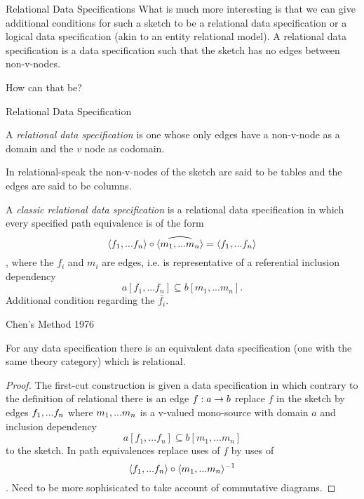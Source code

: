 \begin{frame}{Relational Data Specifications}
What is much more interesting is that we can give additional conditions for such a sketch to be a relational data specification or a logical data specification (akin to an entity relational model).
\medskip
A relational data specification is a data specification 
such that the sketch has no edges between non-v-nodes.

How can that be? 
\end{frame}

\iffalse
\begin{frame}
Well in a relational specification if I wish to represent a morphism 
$f: a \morph b$ in the category, without representing $f$ in the sketch
then I select a mono-source
$\parallelsource{b}{v}{m}{n}$ is a designated and add edges

$\parallelsource{a}{v}{f}{n}$ to the sketch along with 
the commuting diagram
$\tuple{f_1,...f_n} \circ \widehat{\tuple{m_1,...m_n}}=\tuple{f_1,...f_n}$

Then $f$ in the category is constructed from the sketch as $\tuple{f_1,...f_n} \circ \tuple{m_1,...m_n}^{-1}$
\end{frame}
\fi

\begin{frame}{Relational Data Specification}
\begin{definition}
A \textit{relational data specification} is one whose only edges have a non-v-node as a domain and the $v$ node as codomain. 
\end{definition}

In relational-speak the non-v-nodes of the sketch are 
said to be tables and the edges are said to be columns. 

\begin{definition}
A \textit{classic relational data specification} is a
relational data specification
in which every specified path equivalence is of the form 
$$\langle f_1,...f_n\rangle \circ \widehat{\langle m_1,...m_n\rangle}=\langle f_1,...f_n\rangle$$,
where the $f_i$ and $m_i$ are  edges, 
i.e. is representative of a referential inclusion dependency
$$a[f_1,...f_n] \subseteq b[m_1,...m_n].$$
Additional condition regarding the $\bar{f_i}$.
\end{definition}
\end{frame}

\begin{frame}{Chen's Method 1976}
\begin{lemma}
For any data specification there is an equivalent data specification
(one with the same theory category) which is relational.
\end{lemma}
\begin{proof}
The first-cut construction is
given a data specification in which contrary to the definition of relational there is an edge $f:a \morph b$ replace $f$ in the sketch by edges $f_1,...f_n$
where $m_1,...m_n$ is a v-valued mono-source with domain $a$ 
and inclusion dependency 
$$a[f_1,...f_n] \subseteq b[m_1,...m_n]$$
to the sketch.
In path equivalences replace uses of $f$ by uses of
$$\langle f_1,...f_n\rangle\circ \langle m_1,...m_n\rangle^{-1}$$.
Need to be more sophisicated to take account of commutative diagrams.
\end{proof}
\end{frame}

